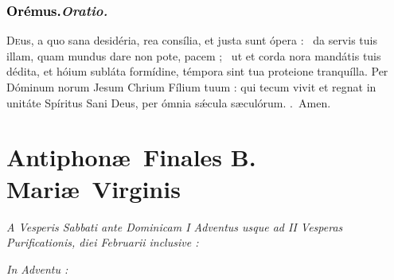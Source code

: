 \documentclass[12pt]{article} %
\newenvironment{rubric}{\color{benred8} \itshape \leftskip 0in \setlength{\parindent}{0.25in}}{\vspace{2 mm}}
\newenvironment{response}{\leftskip 0in \setlength{\parindent}{0in}}{\vspace{2 mm}}
\let\oldgresixstar\gresixstar
\renewcommand{\gresixstar}{\textcolor{benred8}{\oldgresixstar}}
\let\oldgredagger\gredagger
\renewcommand{\gredagger}{\textcolor{benred8}{\oldgredagger}}
\let\oldRbar\Rbar
\renewcommand{\Rbar}{\textcolor{benred8}{\oldRbar .}}
\def\capitulumSpace{\hspace{20 mm}}
\begin{document}
\subsubsection*{\textcolor{black}{Or\'{e}mus.}\capitulumSpace \emph{Oratio.}}

\begin{response}\lettrine{D}{e}us, a quo sana desid\'{e}ria, rea cons\'{i}lia, et justa sunt \'{o}pera : \gredagger\ da servis tuis illam, quam mundus dare non pote, pacem ; \gresixstar\ ut et corda nora mand\'{a}tis tuis d\'{e}dita, et h\'{o}ium subl\'{a}ta form\'{i}dine, t\'{e}mpora sint tua proteione tranqu\'{i}lla. Per D\'{o}minum norum Jesum Chrium F\'{i}lium tuum : qui tecum vivit et regnat in unit\'{a}te Sp\'{i}ritus Sani Deus, per \'{o}mnia s\'{\ae}cula s\ae cul\'{o}rum. \Rbar\ Amen.

\end{response}

\newpage


\section*{Antiphon\ae\ Finales B. Mari\ae\ Virginis}
\label{sec:AntBMV}

\thispagestyle{plain}


\begin{rubric}
\hspace*{25pt}A Vesperis Sabbati ante Dominicam I Adventus usque ad II Vesperas Purificationis, diei Februarii inclusive :

\end{rubric}


\gresetfirstlineaboveinitial{\small \textsc{ \textbf{\textcolor{benred8}{V}}}}{\small \textsc{ \textbf{\textcolor{benred8}{V}}}}

\vspace{2mm}

\begin{rubric}
In Adventu :

\end{rubric}
\end{document}
